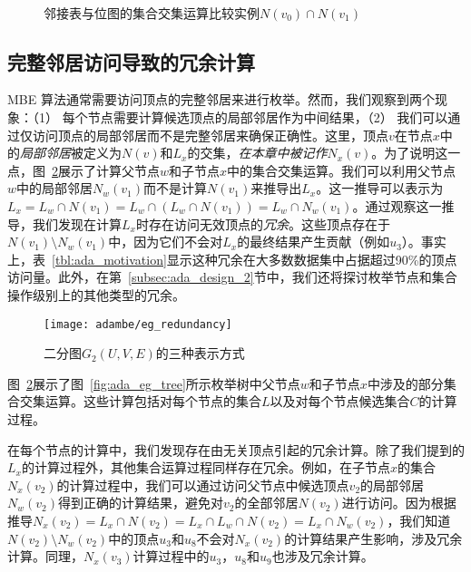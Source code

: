 

\begin{figure} [t]
	\centering

  \\

	\caption{邻接表与位图的集合交集运算比较实例$N(v_0)\cap N(v_1)$}
	\label{fig:adambe_intersection}
\end{figure}

\subsection{完整邻居访问导致的冗余计算}
\label{subsec:ada_limitation}

MBE 算法通常需要访问顶点的完整邻居来进行枚举。然而，我们观察到两个现象：（1） 每个节点需要计算候选顶点的局部邻居作为中间结果，（2） 我们可以通过仅访问顶点的局部邻居而不是完整邻居来确保正确性。这里，顶点$v$在节点$x$中的\emph{局部邻居}被定义为$N(v)$和$L_x$的交集，\emph{在本章中被记作$N_x(v)$}。为了说明这一点，图~\ref{fig:ada_motivation_2}展示了计算父节点$w$和子节点$x$中的集合交集运算。我们可以利用父节点$w$中的局部邻居$N_w(v_1)$而不是计算$N(v_1)$来推导出$L_x$。这一推导可以表示为$L_x = L_w \cap N(v_1) = L_w \cap (L_w \cap N(v_1)) = L_w \cap N_w(v_1)$。通过观察这一推导，我们发现在计算$L_x$时存在访问无效顶点的\emph{冗余}。这些顶点存在于$N(v_1) \setminus N_w(v_1)$中，因为它们不会对$L_x$的最终结果产生贡献（例如$u_3$）。事实上，表~\ref{tbl:ada_motivation}显示这种冗余在大多数数据集中占据超过90\%的顶点访问量。此外，在第~\ref{subsec:ada_design_2}节中，我们还将探讨枚举节点和集合操作级别上的其他类型的冗余。

\begin{figure} [H]
	\centering
  \vspace{0.05in}
	\texttt{[image: adambe/eg\_redundancy]}
  \vspace{0.05in}
	\caption{二分图$G_2(U,V,E)$的三种表示方式}

	\label{fig:ada_motivation_2}
\end{figure}

\begin{example}
  图~\ref{fig:ada_motivation_2}展示了图~\ref{fig:ada_eg_tree}所示枚举树中父节点$w$和子节点$x$中涉及的部分集合交集运算。这些计算包括对每个节点的集合$L$以及对每个节点候选集合$C$的计算过程。

  在每个节点的计算中，我们发现存在由无关顶点引起的冗余计算。除了我们提到的$L_x$的计算过程外，其他集合运算过程同样存在冗余。例如，在子节点$x$的集合$N_x(v_2)$的计算过程中，我们可以通过访问父节点中候选顶点$v_2$的局部邻居$N_w(v_2)$得到正确的计算结果，避免对$v_2$的全部邻居$N(v_2)$进行访问。因为根据推导$N_x(v_2) = L_x\cap N(v_2) = L_x \cap L_w \cap N(v_2) = L_x \cap N_w(v_2)$，我们知道$N(v_2)\setminus N_w(v_2)$中的顶点$u_3$和$u_8$不会对$N_x(v_2)$的计算结果产生影响，涉及冗余计算。同理，$N_x(v_3)$计算过程中的$u_3$，$u_8$和$u_9$也涉及冗余计算。
  
\end{example}

